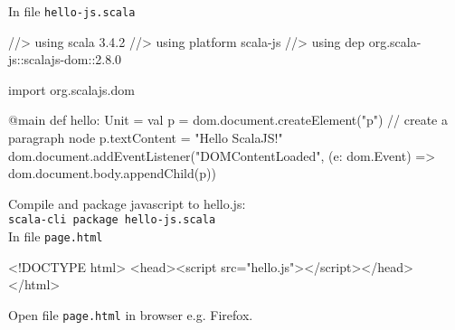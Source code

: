 \documentclass[article, a5paper]{memoir}
\makeatletter
\newcommand{\LangColor}{scalared}
\newcommand{\mc}[1]{\multicolumn{2}{l}{\hspace{-0.65em}\parbox[t]{102mm}{\small #1}}}
\newcommand{\head}[1]{{\bfseries {\color{\LangColor}{#1}}\par\vspace{1mm}\hrule\vspace{-2mm}}}
\newenvironment{etab}%
{\begin{ctabular}{@{}>{\raggedright\small}p{25mm} @{}>{\raggedright\small}p{45mm} @{}>{\raggedright\arraybackslash\small}p{57mm}}}
{\end{ctabular}}%
\newcommand{\subsecend}{\\ \\[-2mm]}
\newcommand{\code}{\lstinline[basicstyle=\ttfamily]}
\newcommand{\Newline}{\vspace{\baselineskip}}
\newcommand{\Comment}[1]{{\color{commentgreen}{#1}}}
\makeatother
\begin{document}





\Newline\vspace*{0.0em}\head{Create a single page web app using ScalaJS}\Newline
{\small
In file \texttt{hello-js.scala} 
\begin{Code}
//> using scala 3.4.2
//> using platform scala-js
//> using dep org.scala-js::scalajs-dom::2.8.0

import org.scalajs.dom

@main def hello: Unit = 
  val p = dom.document.createElement("p")  // create a paragraph node
  p.textContent = "Hello ScalaJS!"
  dom.document.addEventListener("DOMContentLoaded", 
    (e: dom.Event) => dom.document.body.appendChild(p))
\end{Code}
Compile and package javascript to hello.js:\\ \texttt{scala-cli package hello-js.scala}\\[0.5em]
In file \texttt{page.html}
\begin{Code}
<!DOCTYPE html>
<head><script src="hello.js"></script></head>
</html>
\end{Code}
Open file \code{page.html} in browser e.g. Firefox.
}


\end{document}
